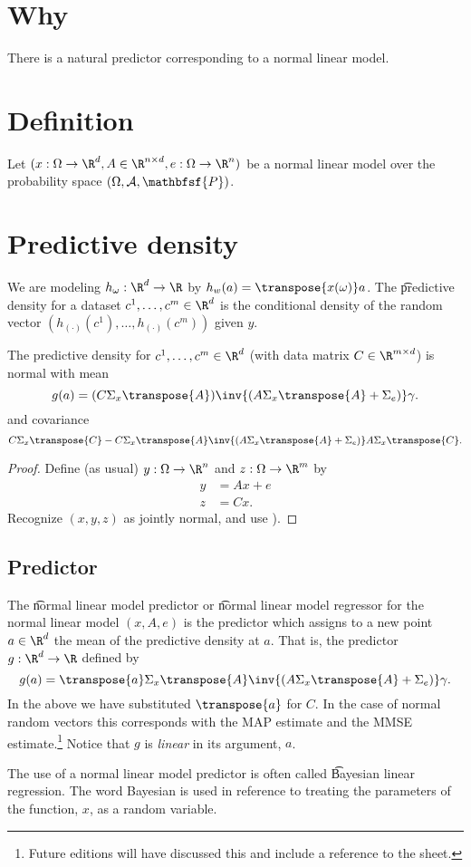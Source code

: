 
\section*{Why}

There is a natural predictor corresponding to a normal linear model.

\section*{Definition}

Let $(x: \Omega  \to \R ^d, A \in \R ^{n \times d}, e: \Omega \to \R ^n)$ be a normal linear model over the probability space $(\Omega , \mathcal{A} , \mathbfsf{P} )$.

\section*{Predictive density}

We are modeling $h_\omega : \R ^d \to \R $ by $h_w(a) = \transpose{x(\omega )}a$.
The \t{predictive density} for a dataset $c^1, \dots , c^m \in \R ^d$ is the conditional density of the random vector $(h_{(\cdot )}(c^1), \dots , h_{(\cdot )}(c^m))$ given $y$.
\begin{proposition}
The predictive density for $c^1, \dots , c^m \in \R ^d$ (with data matrix $C \in \R ^{m \times d}$) is normal with mean
\[
g(a) = (C\Sigma _{x}\transpose{A})\inv{(A\Sigma _{x}\transpose{A} + \Sigma _e)}\gamma .
\]
and covariance
\[
C\Sigma _{x}\transpose{C} - C\Sigma _{x}\transpose{A}\inv{(A\Sigma _{x}\transpose{A} + \Sigma _e)}A\Sigma _{x}\transpose{C}.
\]
\begin{proof}Define (as usual) $y: \Omega  \to \R ^n$ and $z : \Omega  \to \R ^m$ by
\[
\begin{aligned}
y &= Ax + e \\
z &= Cx.
\end{aligned}
\]
Recognize $(x, y, z)$ as jointly normal, and use ).\end{proof}
\end{proposition}


\subsection*{Predictor}

The \t{normal linear model predictor} or \t{normal linear model regressor} for the normal linear model $(x, A, e)$ is the predictor which assigns to a new point $a \in \R ^d$ the mean of the predictive density at $a$.
That is, the predictor $g: \R ^d \to \R $ defined by
\[
g(a) = \transpose{a}\Sigma _{x}\transpose{A}\inv{(A\Sigma _{x}\transpose{A} + \Sigma _e)}\gamma .
\]
In the above we have substituted $\transpose{a}$ for $C$.
In the case of normal random vectors this corresponds with the MAP estimate and the MMSE estimate.\footnote{Future editions will have discussed this and include a reference to the sheet.}
Notice that $g$ is \textit{linear} in its argument, $a$.

The use of a normal linear model predictor is often called \t{Bayesian linear regression}.
The word Bayesian is used in reference to treating the parameters of the function, $x$, as a random variable.

